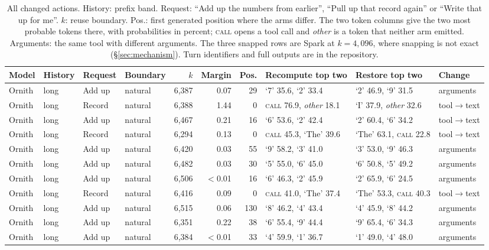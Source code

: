 \begin{table}[p]
\bigskip
\caption{All \ChangesTotal{} changed actions. History: prefix band. Request:
``Add up the numbers from earlier'', ``Pull up that record again'' or ``Write
that up for me''. $k$: reuse boundary. Pos.: first generated position where
the arms differ. The two token columns give the two most probable tokens there,
with probabilities in percent; \textsc{call} opens a tool call and
\textit{other} is a token that neither arm emitted. Arguments: the same tool
with different arguments. The three snapped rows are Spark at
$k=4{,}096$, where snapping is not exact (\S\ref{sec:mechanism}). Turn
identifiers and full outputs are in the repository.}
\label{tab:census}
\footnotesize
\setlength{\tabcolsep}{4pt}
\begin{tabular}{@{}llllrrrlll@{}}
\toprule
Model & History & Request & Boundary & $k$ & Margin & Pos. & Recompute top two & Restore top two & Change \\
\midrule
Ornith & long & Add up & natural & 6{,}387 & 0.07 & 29 & `7' 35.6, `2' 33.4 & `2' 46.9, `9' 31.5 & arguments \\
Ornith & long & Record & natural & 6{,}388 & 1.44 & 0 & \textsc{call} 76.9, \textit{other} 18.1 & `I' 37.9, \textit{other} 32.6 & tool$\to$text \\
Ornith & long & Add up & natural & 6{,}467 & 0.21 & 16 & `6' 53.6, `2' 42.4 & `2' 60.4, `6' 34.2 & tool$\to$text \\
Ornith & long & Record & natural & 6{,}294 & 0.13 & 0 & \textsc{call} 45.3, `The' 39.6 & `The' 63.1, \textsc{call} 22.8 & tool$\to$text \\
Ornith & long & Add up & natural & 6{,}420 & 0.03 & 55 & `9' 58.2, `3' 41.0 & `3' 53.0, `9' 46.3 & arguments \\
Ornith & long & Add up & natural & 6{,}482 & 0.03 & 30 & `5' 55.0, `6' 45.0 & `6' 50.8, `5' 49.2 & arguments \\
Ornith & long & Add up & natural & 6{,}506 & $<$0.01 & 16 & `6' 46.3, `2' 45.9 & `2' 65.9, `6' 24.5 & arguments \\
Ornith & long & Record & natural & 6{,}416 & 0.09 & 0 & \textsc{call} 41.0, `The' 37.4 & `The' 53.3, \textsc{call} 40.3 & tool$\to$text \\
Ornith & long & Add up & natural & 6{,}515 & 0.06 & 130 & `8' 46.2, `4' 43.4 & `4' 45.9, `8' 44.2 & arguments \\
Ornith & long & Add up & natural & 6{,}351 & 0.22 & 38 & `6' 55.4, `9' 44.4 & `9' 65.4, `6' 34.3 & arguments \\
Ornith & long & Add up & natural & 6{,}384 & $<$0.01 & 33 & `4' 59.9, `1' 36.7 & `1' 49.0, `4' 48.0 & arguments \\

\end{tabular}
\end{table}
